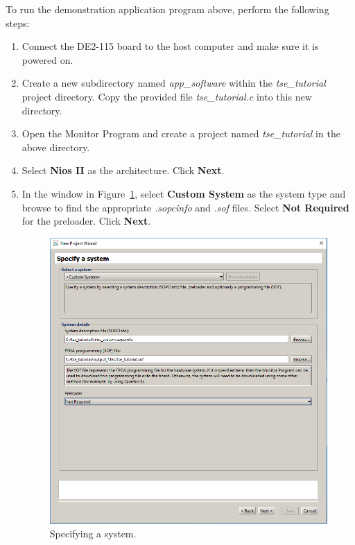 \documentclass[11pt, twoside, pdftex]{article}
\begin{document}
To run the demonstration application program above, perform the following steps:

\begin{enumerate}
	\item Connect the DE2-115 board to the host computer and make sure it is powered on.
	
	\item Create a new subdirectory named {\it app\_software} within the {\it tse\_tutorial} project directory. Copy the provided file {\it tse\_tutorial.c} into this new directory. 
	
	\item Open the Monitor Program and create a project named {\it tse\_tutorial} in the above directory.
	
	\item Select {\bf Nios II} as the architecture. Click {\bf Next}. 
	
	\item In the window in Figure~\ref{fig:monitor_figure1}, select {\bf Custom System} as the system type and browse to find the appropriate {\it .sopcinfo} and {\it .sof} files. Select {\bf Not Required} for the preloader. Click {\bf Next}.
	
	\begin{figure}[H]
		\centering
		  \includegraphics[scale=0.55]{figures/monitor_figure1.png}
		\caption{Specifying a system.} 
		\label{fig:monitor_figure1}
	\end{figure}	
	

\end{enumerate}
\end{document}
